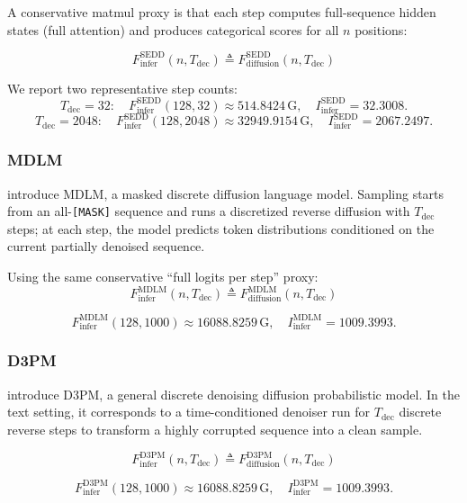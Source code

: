\documentclass[11pt]{article}
\newcommand{\G}{\mathrm{G}} %
\begin{document}
A conservative matmul proxy is that each step computes full-sequence hidden states (full attention)
and produces categorical scores for all $n$ positions:

\[
F_{\text{infer}}^{\text{SEDD}}(n, T_{\text{dec}})
\triangleq F_\text{diffusion}^\text{SEDD}(n, T_{\text{dec}})
\]

We report two representative step counts:
\[
T_{\text{dec}}=32:\quad
F_{\text{infer}}^{\text{SEDD}}(128, 32)\approx \num{514.8424}\,\G,
\quad
I_{\text{infer}}^{\text{SEDD}}=\num{32.3008}.
\]
\[
T_{\text{dec}}=2048:\quad
F_{\text{infer}}^{\text{SEDD}}(128, 2048)\approx \num{32949.9154}\,\G,
\quad
I_{\text{infer}}^{\text{SEDD}}=\num{2067.2497}.
\]

\subsubsection{MDLM}
\label{app:mdlm_100m}

\citet{sahoo2024mdlm} introduce MDLM, a masked discrete diffusion language model. Sampling starts from an all-\texttt{[MASK]}
sequence and runs a discretized reverse diffusion with $T_{\text{dec}}$ steps; at each step, the model predicts token
distributions conditioned on the current partially denoised sequence.

Using the same conservative ``full logits per step'' proxy:
\[
F_{\text{infer}}^{\text{MDLM}}(n, T_{\text{dec}})
\triangleq F_\text{diffusion}^\text{MDLM}(n, T_{\text{dec}})
\]

\[
F_{\text{infer}}^{\text{MDLM}}(128, 1000)\approx \num{16088.8259}\,\G,
\quad
I_{\text{infer}}^{\text{MDLM}}=\num{1009.3993}.
\]

\subsubsection{D3PM}
\label{app:d3pm_100m}

\citet{austin2021structured} introduce D3PM, a general discrete denoising diffusion probabilistic model. In the text setting, it corresponds to a
time-conditioned denoiser run for $T_{\text{dec}}$ discrete reverse steps to transform a highly corrupted sequence into a clean sample.

\[
F_{\text{infer}}^{\text{D3PM}}(n, T_{\text{dec}})
\triangleq
F_\text{diffusion}^\text{D3PM}(n, T_{\text{dec}})
\]

\[
F_{\text{infer}}^{\text{D3PM}}(128, 1000)\approx \num{16088.8259}\,\G,
\quad
I_{\text{infer}}^{\text{D3PM}}=\num{1009.3993}.
\]
\end{document}
